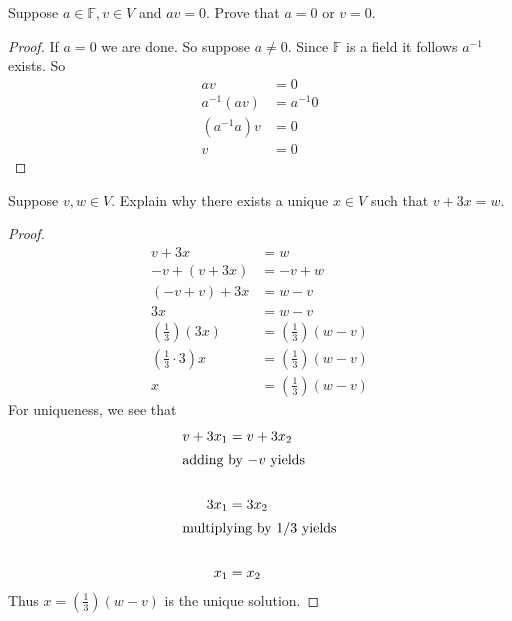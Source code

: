 \begin{exercise} \label{1.B.2}
    Suppose \( a \in \mathbb{F}, v \in V \) and \( av = 0 \). Prove that \( a = 0 \) or \( v = 0 \).
    
    \begin{proof}
        If \( a = 0 \) we are done. So suppose \( a \neq 0 \). Since \( \mathbb{F} \) is a field it follows \( a^{-1} \) exists. So
        \begin{align*}
            a v &= 0 \\
            a^{-1} (a v) &= a^{-1} 0 \\
            (a^{-1} a) v &= 0 \\
            v &= 0
        \end{align*}
    \end{proof}
\end{exercise}

\begin{exercise} \label{1.B.3}
    Suppose \( v,w \in V \). Explain why there exists a unique \( x \in V \) such that \( v + 3x = w \).
    
    \begin{proof}
        \begin{align*}
            v+3x &= w \\
            -v+(v+3x) &= -v+w \\
            (-v+v)+3x &= w-v \\
            3x &= w-v \\
            \left( \frac{1}{3} \right)(3x) &= \left( \frac{1}{3} \right)(w-v) \\
            \left( \frac{1}{3} \cdot 3 \right) x &= \left( \frac{1}{3} \right)(w-v) \\
            x &= \left( \frac{1}{3} \right)(w-v)
        \end{align*}
        For uniqueness, we see that
        \begin{align*}
            v+3x_1 &= v+3x_2 \\
            \intertext{adding by \( -v \) yields} \\
            3x_1 &= 3x_2 \\
            \intertext{multiplying by \( 1/3 \) yields} \\
            x_1 &= x_2
        \end{align*}
        Thus \( x = \left( \frac{1}{3} \right) (w-v) \) is the unique solution.
    \end{proof}
\end{exercise}

